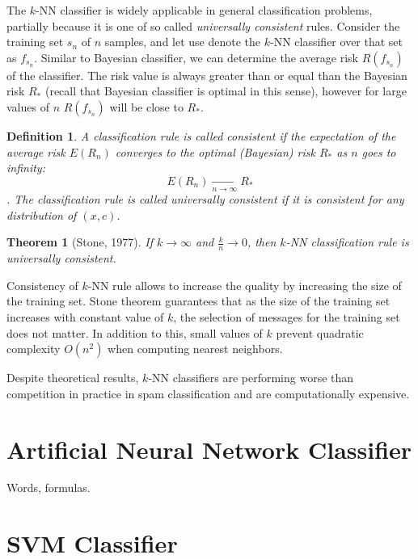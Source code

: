 \documentclass[12pt]{report}
\newtheorem{theorem}{Theorem}[section]
\newtheorem{definition}{Definition}[section]
\begin{document}
The $k$-NN classifier is widely applicable in general classification problems, partially because it is one of so called \textit{universally consistent} rules. Consider the training set $s_n$ of $n$ samples, and let use denote the $k$-NN classifier over that set as $f_{s_n}$. Similar to Bayesian classifier, we can determine the average risk $R(f_{s_n})$ of the classifier. The risk value is always greater than or equal than the Bayesian risk $R_*$ (recall that Bayesian classifier is optimal in this sense), however for large values of $n$ $R(f_{s_n})$ will be close to $R_*$.

\begin{definition}
	A classification rule is called consistent if the expectation of the average risk $E(R_n)$ converges to the optimal (Bayesian) risk $R_*$ as $n$ goes to infinity:
	$$E(R_n) \xrightarrow[n \rightarrow \infty]{} R_*$$.
	The classification rule is called universally consistent if it is consistent for any distribution of $(x, c)$.
\end{definition}

\begin{theorem}[Stone, 1977]
	If $k \rightarrow \infty$ and $\frac{k}{n} \rightarrow 0$, then $k$-NN classification rule is universally consistent.
\end{theorem}

Consistency of $k$-NN rule allows to increase the quality by increasing the size of the training set. Stone theorem guarantees that as the size of the training set increases with constant value of $k$, the selection of messages for the training set does not matter. In addition to this, small values of $k$ prevent quadratic complexity $O(n^2)$ when computing nearest neighbors.

Despite theoretical results, $k$-NN classifiers are performing worse than competition in practice in spam classification and are computationally expensive.

\newpage

\section{Artificial Neural Network Classifier}

Words, formulas.

\newpage

\section{SVM Classifier}
\end{document}
